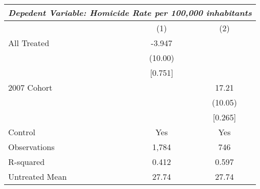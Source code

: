 \documentclass[]{article}
\begin{document}
\begin{table}[h]
    \centering
    \begin{tabular}{lcc} 
        \hline
        \multicolumn{3}{c}{\textit{Depedent Variable: Homicide Rate per 100,000 inhabitants}} \\
        \hline
        & (1) & (2) \\
        \midrule
        All Treated & -3.947 &  \\
        & (10.00) &  \\
        & [0.751] & \\
        \midrule
        2007 Cohort &  & 17.21 \\
        &  & (10.05) \\
        &  & [0.265] \\
        \midrule
        Control & Yes & Yes \\
        Observations & 1,784 & 746 \\
        R-squared & 0.412 & 0.597 \\
        Untreated Mean & 27.74 & 27.74 \\
        \hline
    \end{tabular}
\end{table}
\end{document}
